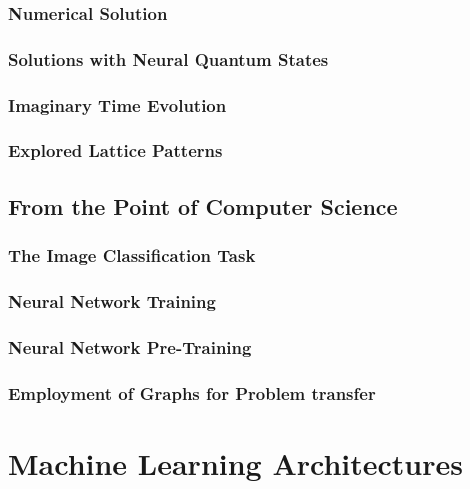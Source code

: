 \documentclass[
headings=optiontohead,              %
12pt,                               %
DIV=13,                             %
twoside=false,                      %
open=right,                         %
BCOR=10mm,                          %
toc=bibliographynumbered            %
]{scrreport}
\begin{document}
        \subsection{Numerical Solution}
        \label{sec:theory-numericalsolution}
        \subsection{Solutions with Neural Quantum States}
        \label{sec:theory-neuralquantumstates}
        \subsection{Imaginary Time Evolution}
        \label{sec:theory-imagenarytimeevolution}
        \subsection{Explored Lattice Patterns}
        \label{sec:theory-latticepatterns}
    \section{From the Point of Computer Science}
        \label{sec:theory-cs}
        
        \FloatBarrier
        \subsection{The Image Classification Task}
        \label{sec:theory-imageclassification}
        \subsection{Neural Network Training}
        \label{sec:theory-neuralnetworktraining}
        \subsection{Neural Network Pre-Training}
        \label{sec:theory-pretraining}
        \subsection{Employment of Graphs for Problem transfer}
        \label{sec:theory-graphs}

\chapter{Machine Learning Architectures}
\label{sec:architectures}
\end{document}
